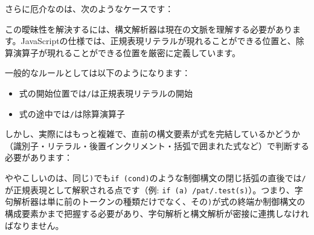 さらに厄介なのは、次のようなケースです：

\begin{Shaded}
\begin{Highlighting}[]
 \OperatorTok{;}  
\OperatorTok{/}\OperatorTok{/}\OperatorTok{;}            
\end{Highlighting}
\end{Shaded}

この曖昧性を解決するには、構文解析器は現在の文脈を理解する必要があります。JavaScriptの仕様では、正規表現リテラルが現れることができる位置と、除算演算子が現れることができる位置を厳密に定義しています。

一般的なルールとしては以下のようになります：

\begin{itemize}
\tightlist
\item
  式の開始位置では\texttt{/}は正規表現リテラルの開始
\item
  式の途中では\texttt{/}は除算演算子
\end{itemize}

しかし、実際にはもっと複雑で、直前の構文要素が式を完結しているかどうか（識別子・リテラル・後置インクリメント・括弧で囲まれた式など）で判断する必要があります：

\begin{Shaded}
\begin{Highlighting}[]
\NormalTok{() }\OperatorTok{/} 

\OperatorTok{=} 

 
\end{Highlighting}
\end{Shaded}

ややこしいのは、同じ\texttt{)}でも\texttt{if\ (cond)}のような制御構文の閉じ括弧の直後では\texttt{/}が正規表現として解釈される点です（例:
\texttt{if\ (a)\ /pat/.test(s)}）。つまり、字句解析器は単に前のトークンの種類だけでなく、その\texttt{)}が式の終端か制御構文の構成要素かまで把握する必要があり、字句解析と構文解析が密接に連携しなければなりません。

